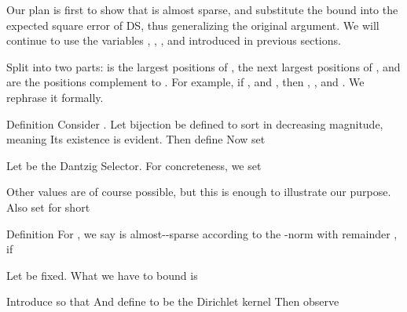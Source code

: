 \startchapter [title={Theorems and Proofs}]

Our plan is first to show that  is almost sparse, and substitute the bound into the expected square error of DS, thus generalizing the original argument.
We will continue to use the variables , , , and  introduced in previous sections.

\startsection [title={Almost-Sparsity of Angular Channel}]

Split  into two parts:  is the largest  positions of ,  the next  largest positions of , and  are the positions complement to .
For example, if , and , then , , and .
We rephrase it formally.

\Result
{Definition}
{
Consider .
Let bijection  be defined to sort  in decreasing magnitude, meaning
Its existence is evident.
Then define
}
Now set

Let  be the Dantzig Selector.
For concreteness, we set

Other values are of course possible, but this is enough to illustrate our purpose.
Also set for short


\Result
{Definition}
{
For , we say  is almost--sparse according to the -norm with remainder , if
}

Let \m {\f} be fixed.
What we have to bound is

Introduce
so that
And define  to be the Dirichlet kernel
Then observe

